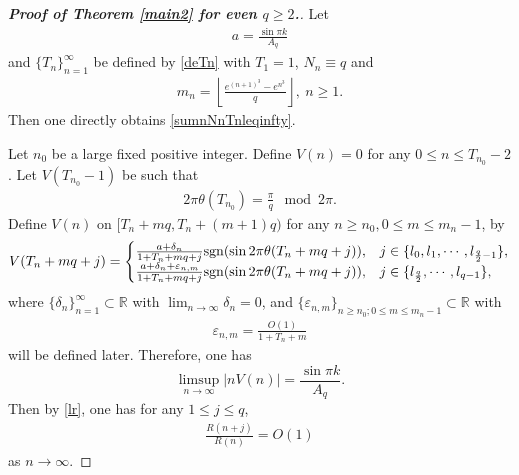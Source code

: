 \documentclass[12pt]{amsart}
\newcommand{\abs}[1]{\left\lvert #1 \right\rvert}
\theoremstyle{plain}
\newcommand{\R}{\mathbb{R}}
\theoremstyle{definition}
\begin{document}
	\begin{proof}[\textbf{Proof of Theorem \ref{main2} for even $q\geq2$.}]
Let 
	\begin{align}
		a=\frac{\sin\pi k}{A_q}\label{sinpikaqa}	
		\end{align}	
and $\{T_n\}_{n=1}^{\infty}$ be defined by \eqref{deTn} with $T_1=1$,
$N_n\equiv q$ and 
\begin{align}
m_n=\left\lfloor\frac{e^{(n+1)^3}-e^{n^3}}{q}\right\rfloor,\ n\geq 1.\nonumber
\end{align}
Then one directly obtains \eqref{sumnNnTnleqinfty}.

		Let $n_0$ be a large fixed positive integer. Define $V(n)=0$ for any $0\leq n\leq T_{n_0}-2$. Let $V(T_{n_0}-1)$ be such that 
\begin{align}
			2\pi\theta(T_{n_0})=\frac{\pi}{q} \mod 2\pi.\nonumber
		\end{align}
Define $V(n)$ on $[T_{n}+mq,T_{n}+(m+1)q)$ for any $n\geq n_0,0\leq m\leq m_n-1$, by
\begin{align}
V(T_n+mq+j)=\begin{cases}
				\frac{a+\delta_{n}}{1+{T}_{n}+mq+j}{\rm{sgn}}(\sin2\pi\theta({T}_{n}+mq+j)), & j\in\{l_0,l_1,\cdots,l_{\frac{q}{2}-1}\},\\
				\frac{a+\delta_{n}+\varepsilon_{n,m}}{1+{T}_{n}+mq+j}{\rm{sgn}}(\sin2\pi\theta({T}_{n}+mq+j)), & j\in\{l_{\frac{q}{2}},\cdots,l_{q-1}\},\label{deVeq}
			\end{cases}
\end{align}
where $\{\delta_n\}_{n=1}^{\infty}\subset\R$ with $\lim_{n\to\infty}\delta_n=0$, and $\{\varepsilon_{n,m}\}_{n\geq n_0;0\leq m\leq m_n-1}\subset\R$  with 
\begin{align}
	\varepsilon_{n,m}=\frac{O(1)}{1+T_n+m}\label{varepsilonnm}
\end{align}
will be defined later. Therefore, one has
$$\limsup_{n\to \infty}\abs{nV(n)}=\frac{\sin\pi k}{A_q}.$$
Then by \eqref{lr}, one has for any $1\leq j\leq q$,
\begin{align}
	\frac{R(n+j)}{R(n)}=O(1)\label{evenO1}
\end{align}
as $n\to\infty$.


\end{proof}
\end{document}
